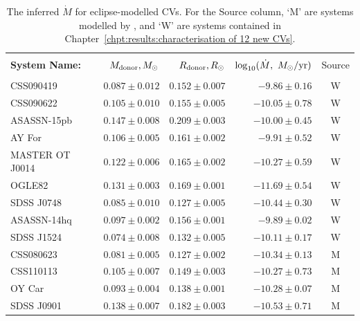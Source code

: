 \begin{table}
    \centering
    \caption{The inferred $\dot M$ for eclipse-modelled CVs. For the Source column, `M' are systems modelled by \citet{McAllister2019}, and `W' are systems contained in Chapter~\ref{chpt:results:characterisation of 12 new CVs}.}
    \label{table:results:mdot modelling}
    \begin{tabular}{lrrrc}
        \hline \\
        {\bf System Name:}  & \textbf{$M_{\rm donor}, M_\odot$}  & \textbf{$R_{\rm donor}, R_\odot$}  & \textbf{$\log_{10}(\dot M,\ M_\odot / {\rm yr})$} & Source\\
        \hline \hline \\
        CSS090419       & $0.087\pm0.012$  & $0.152\pm0.007$   & $  -9.86 \pm 0.16$   & W \\
        CSS090622       & $0.105\pm0.010$  & $0.155\pm0.005$   & $ -10.05 \pm 0.78$   & W \\
        ASASSN-15pb     & $0.147\pm0.008$  & $0.209\pm0.003$   & $ -10.00 \pm 0.45$   & W \\
        AY For          & $0.106\pm0.005$  & $0.161\pm0.002$   & $  -9.91 \pm 0.52$   & W \\
        MASTER OT J0014 & $0.122\pm0.006$  & $0.165\pm0.002$   & $ -10.27 \pm 0.59$   & W \\
        OGLE82          & $0.131\pm0.003$  & $0.169\pm0.001$   & $ -11.69 \pm 0.54$   & W \\
        SDSS J0748      & $0.085\pm0.010$  & $0.127\pm0.005$   & $ -10.44 \pm 0.30$   & W \\
        ASASSN-14hq     & $0.097\pm0.002$  & $0.156\pm0.001$   & $  -9.89 \pm 0.02$   & W \\
        SDSS J1524      & $0.074\pm0.008$  & $0.132\pm0.005$   & $ -10.11 \pm 0.17$   & W \\
        CSS080623       & $0.081\pm0.005$  & $0.127\pm0.002$   & $ -10.34 \pm 0.13$   & M \\
        CSS110113       & $0.105\pm0.007$  & $0.149\pm0.003$   & $ -10.27 \pm 0.73$   & M \\
        OY Car          & $0.093\pm0.004$  & $0.138\pm0.001$   & $ -10.28 \pm 0.07$   & M \\
        SDSS J0901      & $0.138\pm0.007$  & $0.182\pm0.003$   & $ -10.53 \pm 0.71$   & M \\

\end{tabular}
\end{table}
